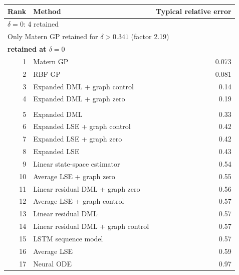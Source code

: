 \begin{tabular}{rlr}
\toprule
Rank & Method & Typical relative error \\
\midrule
\multicolumn{3}{l}{\(\delta=0\): 4 retained} \\
\multicolumn{3}{l}{Only Matern GP retained for \(\delta>0.341\) (factor 2.19)} \\
\multicolumn{3}{l}{\textbf{retained at \(\delta=0\)}} \\
1 & Matern GP & 0.073 \\
2 & RBF GP & 0.081 \\
3 & Expanded DML + graph control & 0.14 \\
4 & Expanded DML + graph zero & 0.19 \\
\addlinespace[2pt]
\multicolumn{3}{l}{\textbf{not retained at \(\delta=0\)}} \\
5 & Expanded DML & 0.33 \\
6 & Expanded LSE + graph control & 0.42 \\
7 & Expanded LSE + graph zero & 0.42 \\
8 & Expanded LSE & 0.43 \\
9 & Linear state-space estimator & 0.54 \\
10 & Average LSE + graph zero & 0.55 \\
11 & Linear residual DML + graph zero & 0.56 \\
12 & Average LSE + graph control & 0.57 \\
13 & Linear residual DML & 0.57 \\
14 & Linear residual DML + graph control & 0.57 \\
15 & LSTM sequence model & 0.57 \\
16 & Average LSE & 0.59 \\
17 & Neural ODE & 0.97 \\
\bottomrule
\end{tabular}
